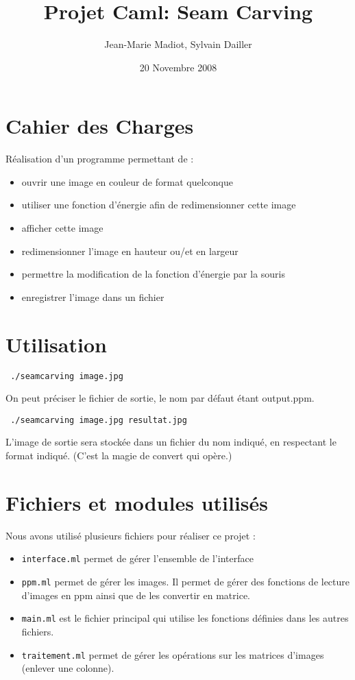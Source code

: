 \documentclass[a4paper]{article}
\title{Projet Caml: Seam Carving}
\author{Jean-Marie Madiot, Sylvain Dailler}
\date{20 Novembre 2008}
\begin{document}
\maketitle{}

\section{Cahier des Charges}

Réalisation d'un programme permettant de :
\begin{itemize}
\item{ouvrir une image en couleur de format quelconque}
\item{utiliser une fonction d'énergie afin de redimensionner cette image}
\item{afficher cette image}
\item{redimensionner l'image en hauteur ou/et en largeur}
\item{permettre la modification de la fonction d'énergie par la souris}
\item{enregistrer l'image dans un fichier}

\end{itemize}

\section{Utilisation}

\begin{verbatim} ./seamcarving image.jpg \end{verbatim}

On peut préciser le fichier de sortie, le nom par défaut étant output.ppm.

\begin{verbatim} ./seamcarving image.jpg resultat.jpg\end{verbatim}

L'image de sortie sera stockée dans un fichier du nom indiqué, en respectant le 
format indiqué. (C'est la magie de convert qui opère.)


\section{Fichiers et modules utilisés}

Nous avons utilisé plusieurs fichiers pour réaliser ce projet : 
\begin{itemize}
\item{{\tt interface.ml} permet de gérer l'ensemble de l'interface} 
\item{{\tt ppm.ml} permet de gérer les images. Il permet de gérer des fonctions de lecture d'images en ppm ainsi que de les  convertir en matrice.}
\item{{\tt main.ml} est le fichier principal qui utilise les fonctions définies dans les autres fichiers.}
\item{{\tt traitement.ml} permet de gérer les opérations sur les matrices d'images (enlever une colonne).} 
\end{itemize}
\end{document}
